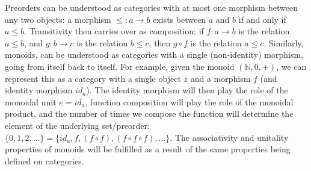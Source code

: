 \documentclass[12pt,a4paper]{article}
\begin{document}
Preorders can be understood as categories with at most one morphism between any two objects: a morphism $\leq : a \to b$ exists between $a$ and $b$ if and only if $a \leq b$. Transitivity then carries over as composition: if $f: a \to b$ is the relation $a \leq b$, and $g: b \to c$ is the relation $b \leq c$, then $g \circ f$ is the relation $a \leq c$. Similarly, monoids, can be understood as categories with a single (non-identity) morphism, going from itself back to itself. For example, given the monoid $(\mathbb{N}, 0, +)$, we can represent this as a category with a single object $z$ and a morphism $f$ (and identity morphism $id_a$). The identity morphism will then play the role of the monoidal unit $e = id_a$, function composition will play the role of the monoidal product, and the number of times we compose the function will determine the element of the underlying set/preorder: $\{0, 1, 2, \ldots \} = \{id_a, f, (f \circ f), (f \circ f \circ f), \ldots \}$. The associativity and unitality properties of monoids will be fulfilled as a result of the same properties being defined on categories.  
\end{document}
